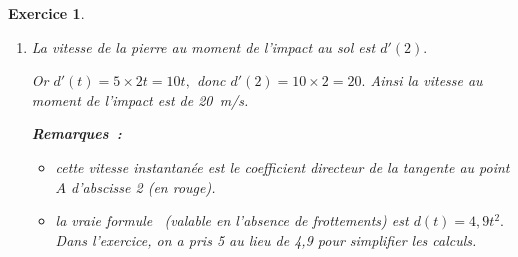 \documentclass[10pt]{article}
\newtheorem{exo}{Exercice}
\begin{document}
\begin{exo}
\begin{enumerate}
\item La vitesse de la pierre au moment de l'impact au sol est $d'(2).$

Or $d'(t)=5\times 2t=10t,$ donc $d'(2)=10\times 2=20.$ Ainsi la vitesse au moment de l'impact est de 20~m/s.

\medskip

\textbf{Remarques~:}

\begin{itemize}
\item[\textbullet] cette vitesse instantanée est le coefficient directeur de la tangente au point $A$ d'abscisse 2 (en rouge).
\item[\textbullet] la \og vraie formule \fg~{}(valable en l'absence de frottements) est $d(t)=4,9t^2.$ Dans l'exercice, on a pris 5 au lieu de 4,9 pour simplifier les calculs.
\end{itemize}
\end{enumerate}

\end{exo}
\end{document}
